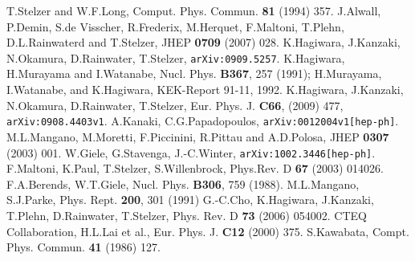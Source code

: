 \documentclass[a4paper,11pt]{article}
\begin{document}
\vspace{2em}
\begin{thebibliography}{15}
T.Stelzer and W.F.Long, Comput. Phys. Commun. {\bf 81}
	(1994) 357.
J.Alwall, P.Demin, S.de Visscher, R.Frederix, M.Herquet,
F.Maltoni, T.Plehn, D.L.Rainwaterd and T.Stelzer, JHEP {\bf 0709} (2007) 028.
K.Hagiwara, J.Kanzaki, N.Okamura, D.Rainwater, T.Stelzer, {\tt arXiv:0909.5257}.
K.Hagiwara, H.Murayama and I.Watanabe,
	Nucl. Phys. {\bf B367}, 257 (1991); H.Murayama, I.Watanabe, and K.Hagiwara, KEK-Report
	91-11, 1992.
K.Hagiwara, J.Kanzaki, N.Okamura, D.Rainwater,
	T.Stelzer, Eur. Phys. J. {\bf C66}, (2009) 477, {\tt
	arXiv:0908.4403v1}.
A.Kanaki, C.G.Papadopoulos, {\tt arXiv:0012004v1[hep-ph]}.
M.L.Mangano, M.Moretti, F.Piccinini, R.Pittau and A.D.Polosa, JHEP {\bf 0307} (2003) 001.
W.Giele, G.Stavenga, J.-C.Winter, {\tt arXiv:1002.3446[hep-ph]}.
F.Maltoni, K.Paul, T.Stelzer, S.Willenbrock,
	Phys.Rev. D {\bf 67} (2003) 014026.
F.A.Berends, W.T.Giele, Nucl. Phys. {\bf B306}, 759 (1988).
M.L.Mangano, S.J.Parke, Phys. Rept. {\bf 200},
	301 (1991)
G.-C.Cho, K.Hagiwara, J.Kanzaki, T.Plehn,
	D.Rainwater, T.Stelzer, Phys. Rev. D {\bf 73} (2006) 054002.
CTEQ Collaboration, H.L.Lai et al., Eur. Phys. J. {\bf C12}
(2000) 375.
S.Kawabata, Compt. Phys. Commun. {\bf 41} (1986) 127.
\end{thebibliography}
\end{document}

